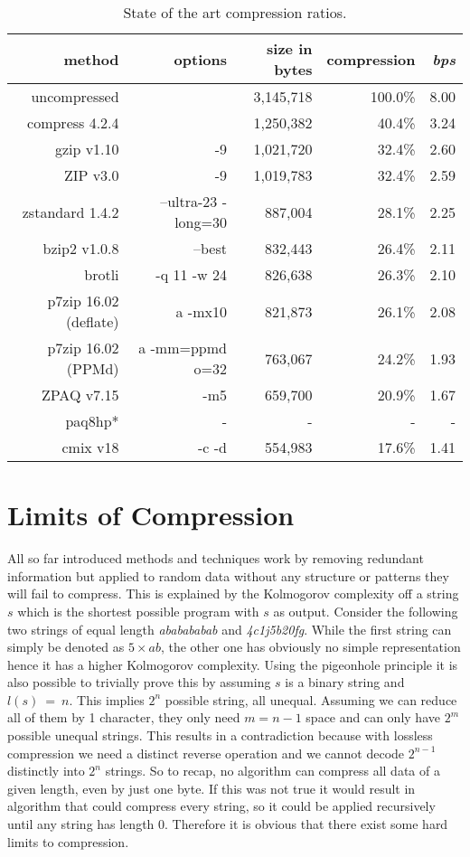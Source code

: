{	\begin{table}[h]
		\begin{tabular}{r|r|r|r|r}
			method & options &  size in bytes & compression & \textit{bps}\\
			\hline
			uncompressed & & 3,145,718 & 100.0\% & 8.00 \\
			compress 4.2.4 & & 1,250,382 & 40.4\% & 3.24 \\
			gzip v1.10 & -9 & 1,021,720 & 32.4\% & 2.60\\
			ZIP v3.0 &-9& 1,019,783 & 32.4\% & 2.59 \\
			zstandard 1.4.2& --ultra-23 -long=30 & 887,004 & 28.1\% & 2.25\\
			bzip2 v1.0.8 & --best & 832,443 & 26.4\% & 2.11 \\
			brotli & -q 11 -w 24 & 826,638 & 26.3\%& 2.10\\
			p7zip 16.02 (deflate) & a -mx10 & 821,873 & 26.1\% & 2.08 \\
			p7zip 16.02 (PPMd) & a -mm=ppmd o=32 & 763,067& 24.2\% & 1.93 \\
			ZPAQ v7.15 & -m5 & 659,700 & 20.9\% & 1.67  \\
			paq8hp* & - & - & - & - \\
			cmix v18 & -c -d & 554,983 & 17.6\% & 1.41 		
		\end{tabular}
				\label{tab:t20 stat of the art}
			\caption{State of the art compression ratios.}
	\end{table}
}

\section{Limits of Compression}
\label{ch:Principles of compression:sec:Limits of Conpression}
\par{
All so far introduced methods and techniques work by removing redundant information but applied to random data without any structure or patterns they will fail to compress. This is explained by the Kolmogorov complexity\cite{kolmogorov} off a string $s$ which is the shortest possible program with $s$ as output. Consider the following two strings of equal length \textit{ababababab} and \textit{4c1j5b20fg}. While the first string can simply be denoted as $5 \times ab$, the other one has obviously no simple representation hence it has a higher Kolmogorov complexity. Using the pigeonhole principle it is also possible to trivially prove this by assuming $s$ is a binary string and $l(s) \: = \: n$. This implies $2^n$ possible string, all unequal. Assuming we can reduce all of them by 1 character, they only need $m = n - 1$ space and can only have $2^m$ possible unequal strings. This results in a contradiction because with lossless compression we need a distinct reverse operation and we cannot decode $2^{n-1}$ distinctly into $2^n$ strings. So to recap, no algorithm can compress all data of a given length, even by just one byte. If this was not true it would result in algorithm that could compress every string, so it could be applied recursively until any string has length 0. Therefore it is obvious that there exist some hard limits to compression.
}
